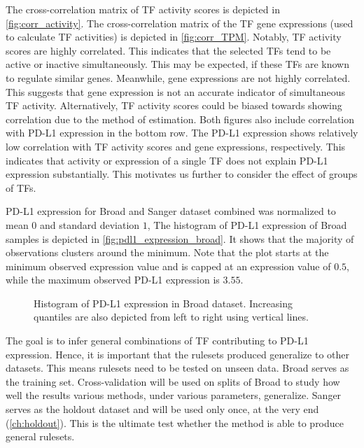 The cross-correlation matrix of TF activity scores is depicted in \autoref{fig:corr_activity}.
The cross-correlation matrix of the TF gene expressions (used to calculate TF activities) is depicted in \autoref{fig:corr_TPM}.
Notably, TF activity scores are highly correlated.
This indicates that the selected TFs tend to be active or inactive simultaneously.
This may be expected, if these TFs are known to regulate similar genes.
Meanwhile, gene expressions are not highly correlated.
This suggests that gene expression is not an accurate indicator of simultaneous TF activity.
Alternatively, TF activity scores could be biased towards showing correlation due to the method of estimation.
Both figures also include correlation with PD-L1 expression in the bottom row.
The PD-L1 expression shows relatively low correlation with TF activity scores and gene expressions, respectively.
This indicates that activity or expression of a single TF does not explain PD-L1 expression substantially.
This motivates us further to consider the effect of groups of TFs.


PD-L1 expression for Broad and Sanger dataset combined was normalized to mean $0$ and standard deviation $1$,
The histogram of PD-L1 expression of Broad samples is depicted in \autoref{fig:pdl1_expression_broad}.
It shows that the majority of observations clusters around the minimum.
Note that the plot starts at the minimum observed expression value and is capped at an expression value of $0.5$,
while the maximum observed PD-L1 expression is $3.55$.

\begin{figure}
    \centering
    
    \caption{Histogram of PD-L1 expression in Broad dataset. Increasing quantiles are also depicted from left to right using vertical lines.}
    \label{fig:pdl1_expression_broad}
\end{figure}

The goal is to infer general combinations of TF contributing to PD-L1 expression.
Hence, it is important that the rulesets produced generalize to other datasets.
This means rulesets need to be tested on unseen data.
Broad serves as the training set.
Cross-validation will be used on splits of Broad to study how well the results various methods, under various parameters, generalize.
Sanger serves as the holdout dataset and will be used only once, at the very end (\autoref{ch:holdout}).
This is the ultimate test whether the method is able to produce general rulesets.

